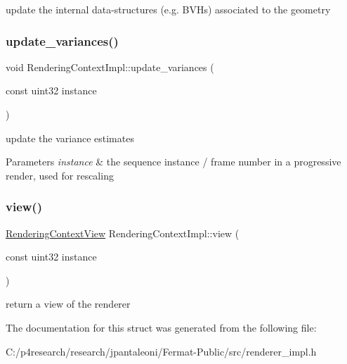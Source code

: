 update the internal data-\/structures (e.\+g. B\+V\+Hs) associated to the geometry \mbox{\label{struct_rendering_context_impl_aa6239f554359fcd6fb8c52343ef6e8ab}} 
\subsubsection{\texorpdfstring{update\+\_\+variances()}{update\_variances()}}
{\footnotesize\ttfamily void Rendering\+Context\+Impl\+::update\+\_\+variances (\begin{DoxyParamCaption}\item[{const uint32}]{instance }\end{DoxyParamCaption})}

update the variance estimates


\begin{DoxyParams}{Parameters}
{\em instance} & the sequence instance / frame number in a progressive render, used for rescaling \\
\hline
\end{DoxyParams}
\mbox{\label{struct_rendering_context_impl_a0c673e0e6bc116a9c035b4ae90973036}} 
\subsubsection{\texorpdfstring{view()}{view()}}
{\footnotesize\ttfamily \hyperlink{struct_rendering_context_view}{Rendering\+Context\+View} Rendering\+Context\+Impl\+::view (\begin{DoxyParamCaption}\item[{const uint32}]{instance }\end{DoxyParamCaption})}

return a view of the renderer 

The documentation for this struct was generated from the following file\+:\begin{DoxyCompactItemize}
\item 
C\+:/p4research/research/jpantaleoni/\+Fermat-\/\+Public/src/renderer\+\_\+impl.\+h\end{DoxyCompactItemize}
